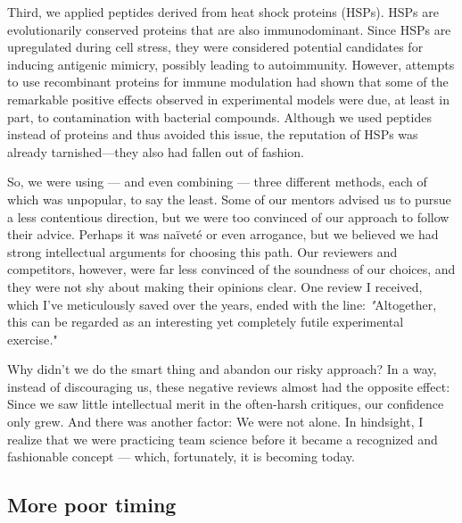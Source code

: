 \documentclass[authordate, editorial]{jote-new-article}
\begin{document}
	Third, we applied peptides derived from heat shock proteins (HSPs). HSPs are evolutionarily conserved proteins that are also immunodominant. Since HSPs are upregulated during cell stress, they were considered potential candidates for inducing antigenic mimicry, possibly leading to autoimmunity. However, attempts to use recombinant proteins for immune modulation had shown that some of the remarkable positive effects observed in experimental models were due, at least in part, to contamination with bacterial compounds. Although we used peptides instead of proteins and thus avoided this issue, the reputation of HSPs was already tarnished—they also had fallen out of fashion.







	So, we were using — and even combining — three different methods, each of which was unpopular, to say the least. Some of our mentors advised us to pursue a less contentious direction, but we were too convinced of our approach to follow their advice. Perhaps it was naïveté or even arrogance, but we believed we had strong intellectual arguments for choosing this path. Our reviewers and competitors, however, were far less convinced of the soundness of our choices, and they were not shy about making their opinions clear. One review I received, which I've meticulously saved over the years, ended with the line: \emph{"}Altogether, this can be regarded as an interesting yet completely futile experimental exercise\emph{.}"\emph{ }







	Why didn't we do the smart thing and abandon our risky approach? In a way, instead of discouraging us, these negative reviews almost had the opposite effect: Since we saw little intellectual merit in the often-harsh critiques, our confidence only grew. And there was another factor: We were not alone. In hindsight, I realize that we were practicing team science before it became a recognized and fashionable concept — which, fortunately, it is becoming today.



	\subsection{More poor timing}
\end{document}
